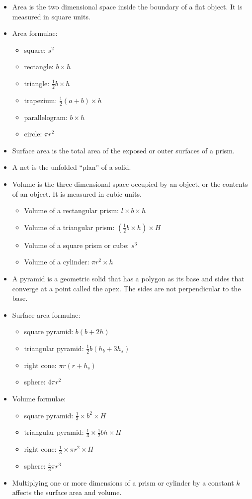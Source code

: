 \begin{itemize}
\item Area is the two dimensional space inside the boundary of a flat
  object. It is measured in square units.
\item Area formulae:
  \begin{itemize}
  \item square: $s^2$
  \item rectangle: $b \times h$
  \item triangle: $\frac{1}{2} b \times h$
  \item trapezium: $\frac{1}{2} (a+b) \times h$
  \item parallelogram: $b \times h$
  \item circle: $\pi r^2$
  \end{itemize}
\item Surface area is the total area of the exposed or outer surfaces of a prism.
\item A net is the unfolded ``plan'' of a solid.
\item Volume is the three dimensional space occupied by an object, or the contents of an
  object. It is measured in cubic units.
  \begin{itemize}
  \item Volume of a rectangular prism: $l \times b \times h$
  \item Volume of a triangular prism: $(\frac{1}{2} b \times h) \times H$
  \item Volume of a square prism or cube: $s^3$
  \item Volume of a cylinder: $\pi r^2 \times h$
  \end{itemize}
\item A pyramid is a geometric solid that has a polygon as its base
  and sides that converge at a point called the apex. The sides are
  not perpendicular to the base.
\item Surface area formulae:
  \begin{itemize}
  \item square pyramid: $b(b+2h)$
  \item triangular pyramid: $\frac{1}{2}b(h_b +3h_s)$
  \item right cone: $\pi r(r+h_s)$
  \item sphere: $4\pi r^2$
  \end{itemize}
\item Volume formulae:
  \begin{itemize}[noitemsep]
  \item square pyramid: $\frac{1}{3} \times b^2 \times H$
  \item triangular pyramid: $\frac{1}{3} \times \frac{1}{2}bh \times H$
  \item right cone: $\frac{1}{3} \times \pi r^2 \times H$
  \item sphere: $\frac{4}{3} \pi r^3$
  \end{itemize}
\item Multiplying one or more dimensions of a prism or cylinder by a
  constant $k$ affects the surface area and volume.
\end{itemize}

